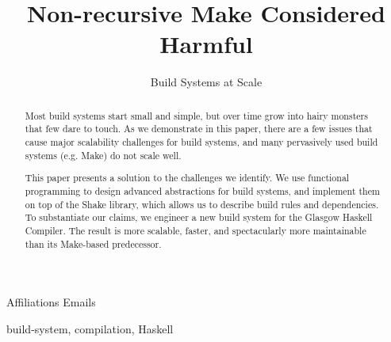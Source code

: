 \documentclass[preprint]{sigplanconf}
\begin{document}
\setlength{\pdfpageheight}{\paperheight}
\setlength{\pdfpagewidth}{\paperwidth}


\title{Non-recursive Make Considered Harmful}
\subtitle{Build Systems at Scale}

           {Affiliations}
           {Emails}

\maketitle

\begin{abstract}
Most build systems start small and simple, but over time grow into hairy monsters
that few dare to touch. As we demonstrate in this paper, there are a few issues
that cause major scalability challenges for build systems, and many pervasively
used build systems (e.g. Make) do not scale well.

This paper presents a solution to the challenges we identify. We use functional
programming to design advanced abstractions for build systems, and implement
them on top of the Shake library, which allows us to describe build rules and
dependencies. To substantiate our claims, we engineer a new build system
for the Glasgow Haskell Compiler. The result is more scalable, faster, and
spectacularly more maintainable than its Make-based predecessor.
\end{abstract}

\keywords
build-system, compilation, Haskell













\balance

\end{document}
